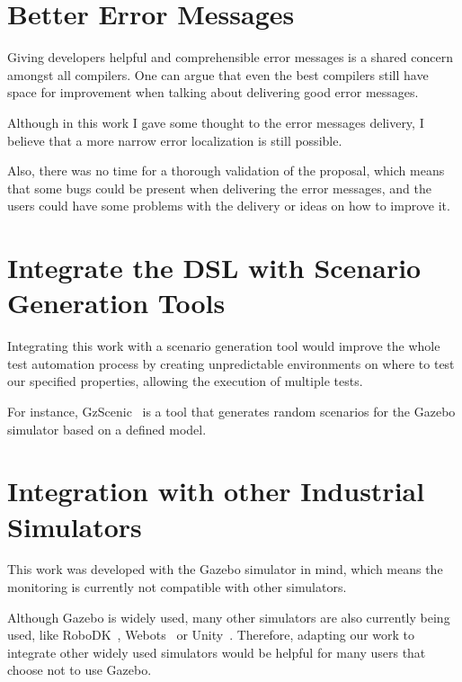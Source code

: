 \section{Better Error Messages}
\label{sec:bettererrormsg}

Giving developers helpful and comprehensible error messages is a shared concern amongst all compilers. One can argue that even the best compilers still have space for improvement when talking about delivering good error messages.

Although in this work I gave some thought to the error messages delivery, I believe that a more narrow error localization is still possible.

Also, there was no time for a thorough validation of the proposal, which means that some bugs could be present when delivering the error messages, and the users could have some problems with the delivery or ideas on how to improve it.


\section{Integrate the DSL with Scenario Generation Tools}
\label{sec:integratescenario}

Integrating this work with a scenario generation tool would improve the whole test automation process by creating unpredictable environments on where to test our specified properties, allowing the execution of multiple tests.

For instance, GzScenic~\cite{AfzalGzScenic} is a tool that generates random scenarios for the Gazebo simulator based on a defined model.


\section{Integration with other Industrial Simulators}
\label{sec:integratesimulators}

This work was developed with the Gazebo simulator in mind, which means the monitoring is currently not compatible with other simulators.

Although Gazebo is widely used, many other simulators are also currently being used, like RoboDK~\cite{robodk}, Webots~\cite{webots} or Unity~\cite{unity}. Therefore, adapting our work to integrate other widely used simulators would be helpful for many users that choose not to use Gazebo.


